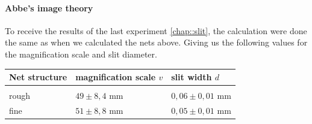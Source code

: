 \paragraph{Abbe's image theory}
To receive the results of the last experiment \ref{chap::slit}, the calculation were done the same as when we calculated the nets above. 
Giving us the following values for the magnification scale and slit diameter.

\begin{tabularx}{\textwidth}{XM{5cm}M{5cm}}%
	\toprule 
	Net structure&magnification scale $v$ & slit width $d$\\
	\hline
	&&\\[-5pt]
	rough	& $49\pm 8,4$ \si{\milli \m} & $0,06 \pm 0,01$ \si{\milli \m}	\\
	fine	& $51\pm 8,8$ \si{\milli \m} & $0,05 \pm 0,01$ \si{\milli \m}	\\	
	\bottomrule 
\end{tabularx}










